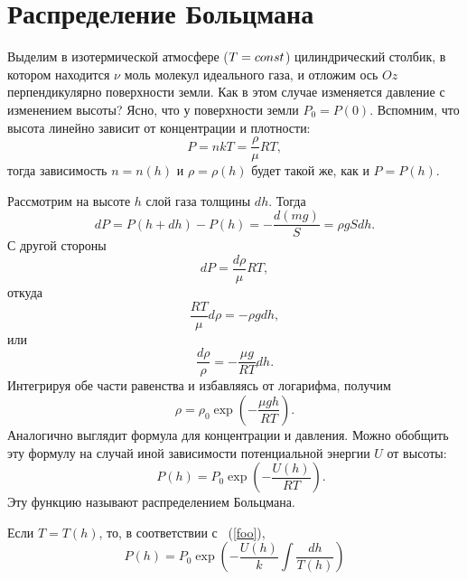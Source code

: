 \section{Распределение Больцмана}

	Выделим в изотермической атмосфере ($T=const$) цилиндрический столбик, в котором находится $\nu$ моль молекул идеального газа, и отложим ось $Oz$ перпендикулярно поверхности земли. Как в этом случае изменяется давление с изменением высоты? Ясно, что у поверхности земли $P_0=P(0)$. Вспомним, что высота линейно зависит от концентрации и плотности:
		$$P=nkT=\dfrac{\rho}{\mu}RT,$$ 
	тогда зависимость $n=n(h)$ и $\rho=\rho(h)$ будет такой же, как и $P=P(h)$.\par
	Рассмотрим на высоте $h$ слой газа толщины $dh$. Тогда
		$$dP=P(h+dh)-P(h)=-\frac{d(mg)}{S}=\rho gSdh.$$
	С другой стороны
		$$dP=\frac{d\rho}{\mu}RT,$$
	откуда
		$$\frac{RT}{\mu}d\rho=-\rho gdh,$$
	или
	\begin{equation}\label{foo}
		\frac{d\rho}{\rho}=-\frac{\mu g}{RT}dh.
	\end{equation}
	Интегрируя обе части равенства и избавляясь от логарифма, получим
		$$\rho=\rho_0\exp{\left(-\dfrac{\mu gh}{RT}\right)}.$$
	Аналогично выглядит формула для концентрации и давления. Можно обобщить эту формулу на случай иной зависимости потенциальной энергии $U$ от высоты:
	\begin{equation}\label{boltzmann}
		\quad P(h)=P_0\exp{\left(-\dfrac{U(h)}{RT}\right)}.
	\end{equation}
	Эту функцию называют распределением Больцмана.\par
	Если $T=T(h)$, то, в соответствии с ~(\ref{foo}),
	\begin{equation}
		P(h)=P_0\exp{\left(-\frac{U(h)}{k}\int \frac{dh}{T(h)}\right)}
	\end{equation}
